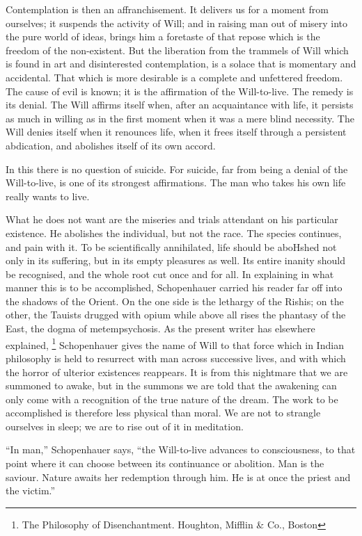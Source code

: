 \documentclass[]{book}
\let\rmarkdownfootnote\footnote%
\def\footnote{\protect\rmarkdownfootnote}
\begin{document}
Contemplation is then an affranchisement. It delivers us for a moment
from ourselves; it suspends the activity of Will; and in raising man out
of misery into the pure world of ideas, brings him a foretaste of that
repose which is the freedom of the non-existent. But the liberation from
the trammels of Will which is found in art and disinterested
contemplation, is a solace that is momentary and accidental. That which
is more desirable is a complete and unfettered freedom. The cause of
evil is known; it is the affirmation of the Will-to-live. The remedy is
its denial. The Will affirms itself when, after an acquaintance with
life, it persists as much in willing as in the first moment when it was
a mere blind necessity. The Will denies itself when it renounces life,
when it frees itself through a persistent abdication, and abolishes
itself of its own accord.

In this there is no question of suicide. For suicide, far from being a
denial of the Will-to-live, is one of its strongest affirmations. The
man who takes his own life really wants to live.

What he does not want are the miseries and trials attendant on his
particular existence. He abolishes the individual, but not the race. The
species continues, and pain with it. To be scientifically annihilated,
life should be aboHshed not only in its suffering, but in its empty
pleasures as well. Its entire inanity should be recognised, and the
whole root cut once and for all. In explaining in what manner this is to
be accomplished, Schopenhauer carried his reader far off into the
shadows of the Orient. On the one side is the lethargy of the Rishis; on
the other, the Tauists drugged with opium while above all rises the
phantasy of the East, the dogma of metempsychosis. As the present writer
has elsewhere explained, \footnote{The Philosophy of Disenchantment.
  Houghton, Mifflin \& Co., Boston} Schopenhauer gives the name of Will
to that force which in Indian philosophy is held to resurrect with man
across successive lives, and with which the horror of ulterior
existences reappears. It is from this nightmare that we are summoned to
awake, but in the summons we are told that the awakening can only come
with a recognition of the true nature of the dream. The work to be
accomplished is therefore less physical than moral. We are not to
strangle ourselves in sleep; we are to rise out of it in meditation.

``In man,'' Schopenhauer says, ``the Will-to-live advances to
consciousness, to that point where it can choose between its continuance
or abolition. Man is the saviour. Nature awaits her redemption through
him. He is at once the priest and the victim.''
\end{document}
